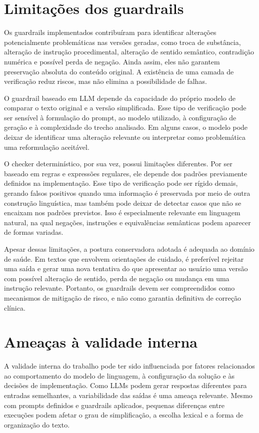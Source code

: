 \section{Limitações dos guardrails}
\label{sec:limitacoes-guardrails}

Os guardrails implementados contribuíram para identificar alterações potencialmente problemáticas nas versões geradas, como troca de substância, alteração de instrução procedimental, alteração de sentido semântico, contradição numérica e possível perda de negação. Ainda assim, eles não garantem preservação absoluta do conteúdo original. A existência de uma camada de verificação reduz riscos, mas não elimina a possibilidade de falhas.

O guardrail baseado em LLM depende da capacidade do próprio modelo de comparar o texto original e a versão simplificada. Esse tipo de verificação pode ser sensível à formulação do prompt, ao modelo utilizado, à configuração de geração e à complexidade do trecho analisado. Em alguns casos, o modelo pode deixar de identificar uma alteração relevante ou interpretar como problemática uma reformulação aceitável.

O checker determinístico, por sua vez, possui limitações diferentes. Por ser baseado em regras e expressões regulares, ele depende dos padrões previamente definidos na implementação. Esse tipo de verificação pode ser rígido demais, gerando falsos positivos quando uma informação é preservada por meio de outra construção linguística, mas também pode deixar de detectar casos que não se encaixam nos padrões previstos. Isso é especialmente relevante em linguagem natural, na qual negações, instruções e equivalências semânticas podem aparecer de formas variadas.

Apesar dessas limitações, a postura conservadora adotada é adequada ao domínio de saúde. Em textos que envolvem orientações de cuidado, é preferível rejeitar uma saída e gerar uma nova tentativa do que apresentar ao usuário uma versão com possível alteração de sentido, perda de negação ou mudança em uma instrução relevante. Portanto, os guardrails devem ser compreendidos como mecanismos de mitigação de risco, e não como garantia definitiva de correção clínica.

\section{Ameaças à validade interna}
\label{sec:ameacas-validade-interna}

A validade interna do trabalho pode ter sido influenciada por fatores relacionados ao comportamento do modelo de linguagem, à configuração da solução e às decisões de implementação. Como LLMs podem gerar respostas diferentes para entradas semelhantes, a variabilidade das saídas é uma ameaça relevante. Mesmo com prompts definidos e guardrails aplicados, pequenas diferenças entre execuções podem afetar o grau de simplificação, a escolha lexical e a forma de organização do texto.

